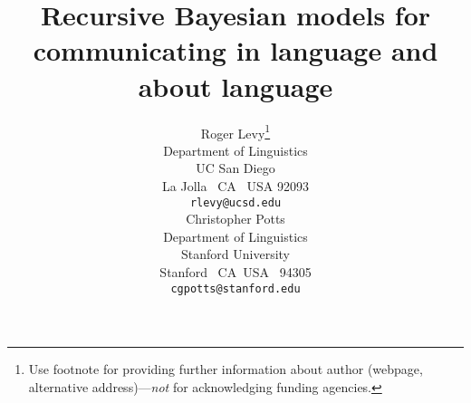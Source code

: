 \documentclass{article} %
\title{Recursive Bayesian models for communicating in language and about language}
\author{
Roger Levy\thanks{Use footnote for providing further information
about author (webpage, alternative address)---\emph{not} for acknowledging
funding agencies.} \\
Department of Linguistics\\
UC San Diego\\
La Jolla \ CA \ USA 92093\\
\texttt{rlevy@ucsd.edu} \\
\And
Christopher Potts \\
Department of Linguistics\\
Stanford University\\
Stanford \ CA\  USA \ 94305\\
\texttt{cgpotts@stanford.edu}
}
\theoremstyle{definition}
\begin{document}
\maketitle

\begin{abstract}
  
\end{abstract}










\end{document}
